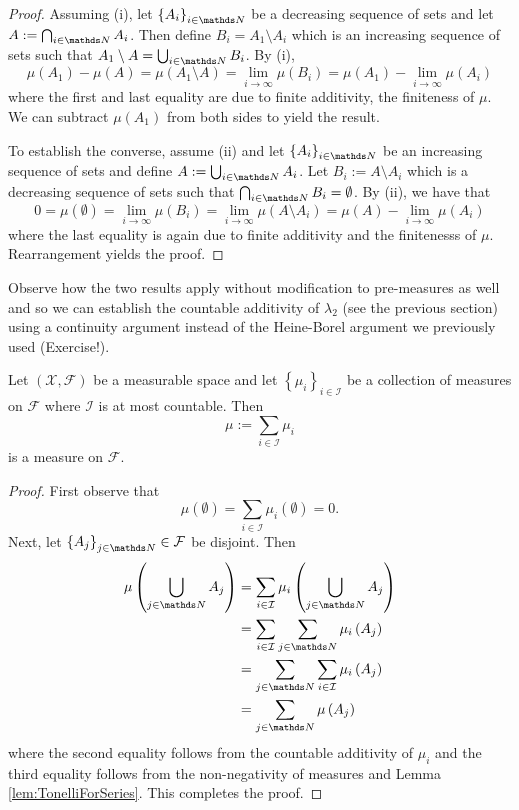 \begin{proof}
Assuming (i), let $\left\{ A_{i}\right\} _{i\in\N}$ be a decreasing
sequence of sets and let $A:=\bigcap_{i\in\N}A_{i}$. Then define
$B_{i}=A_{1}\setminus A_{i}$ which is an increasing sequence of sets
such that $A_{1}\setminus A=\bigcup_{i\in\N}B_{i}$. By (i), 
\[
\mu\left(A_{1}\right)-\mu\left(A\right)=\mu\left(A_{1}\setminus A\right)=\lim_{i\to\infty}\mu\left(B_{i}\right)=\mu\left(A_{1}\right)-\lim_{i\to\infty}\mu\left(A_{i}\right)
\]
where the first and last equality are due to finite additivity, the
finiteness of $\mu.$ We can subtract $\mu\left(A_{1}\right)$ from
both sides to yield the result.

To establish the converse, assume (ii) and let $\left\{ A_{i}\right\} _{i\in\N}$
be an increasing sequence of sets and define $A:=\bigcup_{i\in\N}A_{i}$.
Let $B_{i}:=A\setminus A_{i}$ which is a decreasing sequence of sets
such that $\bigcap_{i\in\N}B_{i}=\emptyset$. By (ii), we have that
\[
0=\mu\left(\emptyset\right)=\lim_{i\to\infty}\mu\left(B_{i}\right)=\lim_{i\to\infty}\mu\left(A\setminus A_{i}\right)=\mu\left(A\right)-\lim_{i\to\infty}\mu\left(A_{i}\right)
\]
where the last equality is again due to finite additivity and the
finitenesss of $\mu.$ Rearrangement yields the proof.
\end{proof}
Observe how the two results apply without modification to pre-measures
as well and so we can establish the countable additivity of $\lambda_{2}$
(see the previous section) using a continuity argument instead of
the Heine-Borel argument we previously used (Exercise!).
\begin{prop}
\label{prop:sumOfCountableMeasures}Let $\left(\mathcal{X},\mathcal{F}\right)$
be a measurable space and let $\left\{ \mu_{i}\right\} _{i\in\mathcal{I}}$
be a collection of measures on $\mathcal{F}$ where $\mathcal{I}$
is at most countable. Then
\[
\mu:=\sum_{i\in\mathcal{I}}\mu_{i}
\]
is a measure on $\mathcal{F}$.
\end{prop}

\begin{proof}
First observe that 
\[
\mu\left(\emptyset\right)=\sum_{i\in\mathcal{I}}\mu_{i}\left(\emptyset\right)=0.
\]
Next, let $\left\{ A_{j}\right\} _{j\in\N}\in\mathcal{F}$ be disjoint.
Then
\begin{align*}
\mu\left(\bigcup_{j\in\N}A_{j}\right) & =\sum_{i\in\mathcal{I}}\mu_{i}\left(\bigcup_{j\in\N}A_{j}\right)\\
 & =\sum_{i\in\mathcal{I}}\sum_{j\in\N}\mu_{i}\left(A_{j}\right)\\
 & =\sum_{j\in\N}\sum_{i\in\mathcal{I}}\mu_{i}\left(A_{j}\right)\\
 & =\sum_{j\in\N}\mu\left(A_{j}\right)
\end{align*}
where the second equality follows from the countable additivity of
$\mu_{i}$ and the third equality follows from the non-negativity
of measures and Lemma \ref{lem:TonelliForSeries}. This completes
the proof.
\end{proof}

